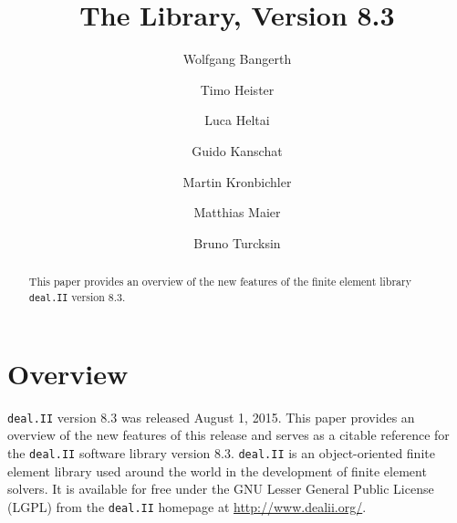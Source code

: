 \documentclass{ansarticle-preprint}
\title{The \dealii{} Library, Version 8.3}
\author[1]{Wolfgang Bangerth}
\affil[1]{Department of Mathematics, Texas A\&M University, College Station,
    TX 77843, USA,
    {\texttt{bangerth@math.tamu.edu}}}
\author[2]{Timo Heister}
\affil[2]{Mathematical Sciences,
O-110 Martin Hall.
Clemson University.
Clemson, SC 29634, USA,
{\texttt{heister@clemson.edu}}}
\author[3]{Luca Heltai}
\affil[3]{SISSA - International School for Advanced Studies, Via
  Bonomea 265, 34136 Trieste, Italy,
  {\texttt{luca.heltai@sissa.it}}}
\author[4]{Guido Kanschat}
\affil[4]{Interdisciplinary Center for Scientific Computing (IWR),
  Universität Heidelberg, Im Neuenheimer Feld 368, 69120 Heidelberg, Germany,
  {\texttt{kanschat@uni-heidelberg.de}}}
\author[5]{Martin Kronbichler}
\affil[5]{Institute for Computational Mechanics, Technische
  Universität München, Boltzmannstr.~15, 85748 Garching b. München,
  Germany,
  {\texttt{kronbichler@lnm.mw.tum.de}}}
\author[6]{Matthias Maier}
\affil[6]{School of Mathematics, University of Minnesota, 127 Vincent Hall,
  206 Church Street SE, Minneapolis, MN 55455, USA,
  {\texttt{msmaier@umn.edu}}}
\author[7]{Bruno Turcksin}
\affil[7]{Department of Mathematics, Texas A\&M University, College Station,
  TX 77843, USA,
  {\texttt{turcksin@math.tamu.edu}}}
\newcommand{\specialword}[1]{\texttt{#1}}
\newcommand{\dealii}{{\specialword{deal.II}}}
\begin{document}
\maketitle

\begin{abstract}
  This paper provides an overview of the new features of the finite element
  library \dealii{} version 8.3.
\end{abstract}


\section{Overview}

\dealii{} version 8.3 was released August 1, 2015. This paper provides an
overview of the new features of this release and serves as a citable
reference for the \dealii{} software library version 8.3. \dealii{} is an
object-oriented finite element library used around the world in the
development of finite element solvers. It is available for free under the
GNU Lesser General Public License (LGPL) from the \dealii{} homepage at
\url{http://www.dealii.org/}.
\end{document}
